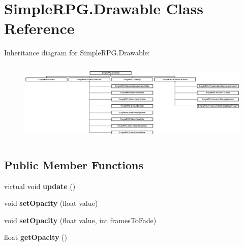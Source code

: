 \hypertarget{class_simple_r_p_g_1_1_drawable}{\section{Simple\+R\+P\+G.\+Drawable Class Reference}
\label{class_simple_r_p_g_1_1_drawable}
}
Inheritance diagram for Simple\+R\+P\+G.\+Drawable\+:\begin{figure}[H]
\begin{center}
\leavevmode
\includegraphics[height=3.916084cm]{class_simple_r_p_g_1_1_drawable}
\end{center}
\end{figure}
\subsection*{Public Member Functions}
\begin{DoxyCompactItemize}
\item 
\hypertarget{class_simple_r_p_g_1_1_drawable_a5a0bce0391462d1a6dd89f42b2db285d}{virtual void {\bfseries update} ()}\label{class_simple_r_p_g_1_1_drawable_a5a0bce0391462d1a6dd89f42b2db285d}

\item 
\hypertarget{class_simple_r_p_g_1_1_drawable_a25a8469074c74391bce1d6cbf9e44c5d}{void {\bfseries set\+Opacity} (float value)}\label{class_simple_r_p_g_1_1_drawable_a25a8469074c74391bce1d6cbf9e44c5d}

\item 
\hypertarget{class_simple_r_p_g_1_1_drawable_a9210f178abf928fa27b822d73c7c0005}{void {\bfseries set\+Opacity} (float value, int frames\+To\+Fade)}\label{class_simple_r_p_g_1_1_drawable_a9210f178abf928fa27b822d73c7c0005}

\item 
\hypertarget{class_simple_r_p_g_1_1_drawable_a6c4159739e886073e9fc6567825c176e}{float {\bfseries get\+Opacity} ()}\label{class_simple_r_p_g_1_1_drawable_a6c4159739e886073e9fc6567825c176e}

\end{DoxyCompactItemize}
